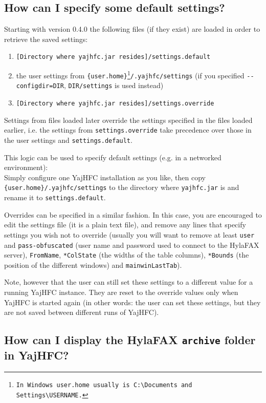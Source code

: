 \documentclass[a4paper,10pt]{scrartcl}
\begin{document}
\subsection{How can I specify some default settings?}

Starting with version 0.4.0 the following files (if they exist) are loaded in order to retrieve the saved settings:
\begin{enumerate}
 \item \texttt{[Directory where yajhfc.jar resides]/settings.default}
 \item the user settings from \texttt{\{user.home\}\footnote{In Windows \texttt{user.home} usually is \texttt{C:\textbackslash Documents and Settings\textbackslash USERNAME}.}/.yajhfc/settings} (if you specified \texttt{-{-}configdir=DIR}, \texttt{DIR/settings} is used instead)
 \item \texttt{[Directory where yajhfc.jar resides]/settings.override}
\end{enumerate}

Settings from files loaded later override the settings specified in the files loaded earlier, i.e. the settings from \texttt{settings.override} take precedence over those in the user settings and \texttt{settings.default}.
\medskip

This logic can be used to specify default settings (e.g. in a networked environment): \\
Simply configure one YajHFC installation as you like, then copy \texttt{\{user.home\}/.yajhfc/settings} to the directory where \texttt{yajhfc.jar} is and rename it to \texttt{settings.default}.
\medskip

Overrides can be specified in a similar fashion. In this case, you are encouraged to edit the settings file (it is a plain text file), and remove any lines that specify settings you wish not to override (usually you will want to remove at least \texttt{user} and \texttt{pass-obfuscated} (user name and password used to connect to the HylaFAX server), \texttt{FromName}, \texttt{*ColState} (the widths of the table columns), \texttt{*Bounds} (the position of the different windows) and \texttt{mainwinLastTab}).

Note, however that the user can still set these settings to a different value for a running YajHFC instance. They are reset to the override values only when YajHFC is started again (in other words: the user can set these settings, but they are not saved between different runs of YajHFC).


\subsection{How can I display the HylaFAX \texttt{archive} folder in YajHFC?}
\end{document}
